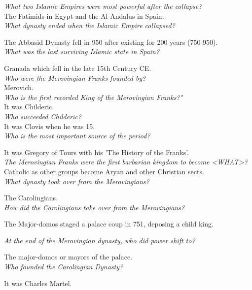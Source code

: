 \documentclass[12pt]{article}
\begin{document}
\textit{What two Islamic Empires were most powerful after the collapse?}\\
The Fatimids in Egypt and the Al-Andalus in Spain.\\

\textit{What dynasty ended when the Islamic Empire collapsed?}

The Abbasid Dynasty fell in 950 after existing for 200 years (750-950).\\

\textit{What was the last surviving Islamic state in Spain?}

Granada which fell in the late 15th Century CE.\\

\textit{Who were the Merovingian Franks founded by?}\\
Merovich.\\

\textit{Who is the first recorded King of the Merovingian Franks?"}\\
It was Childeric.\\

\textit{Who succeeded Childeric?}\\
It was Clovis when he was 15.\\

\textit{Who is the most important source of the period?}

It was Gregory of Tours with his 'The History of the Franks'.\\

\textit{The Merovingian Franks were the first barbarian kingdom to become <WHAT>?}\\
Catholic as other groups become Aryan and other Christian sects.\\

\textit{What dynasty took over from the Merovingians?}

The Carolingians.\\


\textit{How did the Carolingians take over from the Merovingians?}

The Major-domos staged a palace coup in 751, deposing a child king.

\textit{At the end of the Merovingian dynasty, who did power shift to?}

The major-domos or mayors of the palace.\\

\textit{Who founded the Carolingian Dynasty?}

It was Charles Martel.\\
\end{document}
